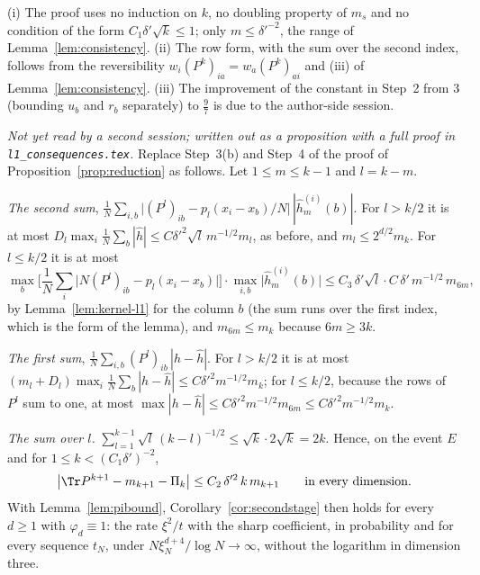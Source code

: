 \begin{remark}
(i) The proof uses no induction on $k$, no doubling property of $m_s$ and no condition of the form
$C_1\delta'\sqrt k\le1$; only $m\le\delta'^{-2}$, the range of Lemma~\ref{lem:consistency}. (ii) The row
form, with the sum over the second index, follows from the reversibility
$w_i(P^k)_{ia}=w_a(P^k)_{ai}$ and (iii) of Lemma~\ref{lem:consistency}. (iii) The improvement of the
constant in Step~2 from $3$ (bounding $u_b$ and $r_b$ separately) to $\frac97$ is due to the author-side
session.
\end{remark}

\begin{remark}\label{rem:l1-reduction}
\emph{Not yet read by a second session; written out as a proposition with a full proof in \texttt{l1\_consequences.tex}.} Replace Step~3(b) and Step~4 of the proof of
Proposition~\ref{prop:reduction} as follows. Let $1\le m\le k-1$ and $l=k-m$.

\emph{The second sum}, $\frac1N\sum_{i,b}\big|(P^l)_{ib}-p_l(x_i-x_b)/N\big|\,|\hat h^{(i)}_m(b)|$. For
$l>k/2$ it is at most $D_l\max_i\frac1N\sum_b|\hat h|\le C\delta'^2\sqrt l\,m^{-1/2}m_l$, as before, and
$m_l\le2^{d/2}m_k$. For $l\le k/2$ it is at most
\[
 \max_b\Big[\frac1N\sum_i\big|N(P^l)_{ib}-p_l(x_i-x_b)\big|\Big]\cdot\max_{i,b}\big|\hat h^{(i)}_m(b)\big|
 \le C_3\,\delta'\sqrt l\cdot C\,\delta'\,m^{-1/2}\,m_{6m},
\]
by Lemma~\ref{lem:kernel-l1} for the column $b$ (the sum runs over the first index, which is the form of
the lemma), and $m_{6m}\le m_k$ because $6m\ge3k$.

\emph{The first sum}, $\frac1N\sum_{i,b}(P^l)_{ib}\,|h-\hat h|$. For $l>k/2$ it is at most
$(m_l+D_l)\max_i\frac1N\sum_b|h-\hat h|\le C\delta'^2m^{-1/2}m_k$; for $l\le k/2$, because the rows of
$P^l$ sum to one, at most $\max|h-\hat h|\le C\delta'^2m^{-1/2}m_{6m}\le C\delta'^2m^{-1/2}m_k$.

\emph{The sum over $l$.} $\sum_{l=1}^{k-1}\sqrt l\,(k-l)^{-1/2}\le\sqrt k\cdot2\sqrt k=2k$. Hence, on the
event $E$ and for $1\le k<(C_1\delta')^{-2}$,
\[
 \big|\Tr P^{k+1}-m_{k+1}-\Pi_k\big|\le C_2\,\delta'^2\,k\,m_{k+1}\qquad\text{in every dimension.}
\]
With Lemma~\ref{lem:pibound}, Corollary~\ref{cor:secondstage} then holds for every $d\ge1$ with
$\varphi_d\equiv1$: the rate $\xi^2/t$ with the sharp coefficient, in probability and for every sequence
$t_N$, under $N\xi_N^{d+4}/\log N\to\infty$, without the logarithm in dimension three.
\end{remark}

